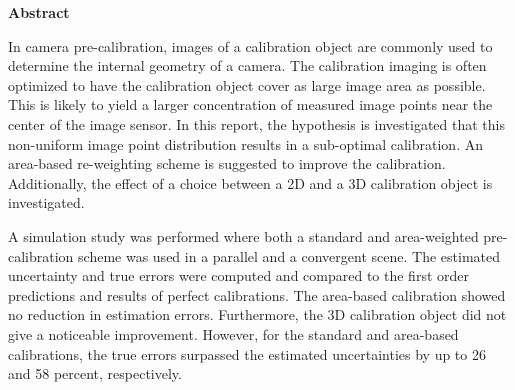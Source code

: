 \centering \textbf{Abstract}

    In camera pre-calibration, images of a calibration object are commonly 
    used to determine the internal geometry of a camera.
    The calibration imaging is often optimized to have the calibration object 
    cover as large image area as possible.
    This is likely to yield a larger concentration
    of measured image points near the center of the image sensor.
    In this report, the hypothesis is investigated that this 
    non-uniform image point distribution results in a sub-optimal calibration.
    An area-based re-weighting scheme is suggested to improve the calibration.
    Additionally, the effect of a choice between a 2D and a 3D calibration
    object is investigated.
    
    A simulation study was performed where both a standard and area-weighted
    pre-calibration scheme was used in a parallel and a convergent scene.
    The estimated uncertainty and true errors were computed
    and compared to the first order predictions and results of perfect calibrations.
    The area-based calibration showed no reduction in estimation errors.
    Furthermore, the 3D calibration object did not give a noticeable improvement.
    However, for the standard and area-based calibrations, the true errors
    surpassed the estimated uncertainties by up to
    26 and 58 percent, respectively.
